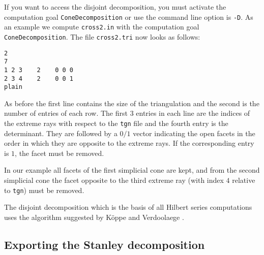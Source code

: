 \documentclass[12pt,a4paper]{scrartcl}
\theoremstyle{definition}
\begin{document}
{\begin{center}
\begin{scriptsize}
	\end{scriptsize}
\end{center}

If you want to access the disjoint decomposition, you must activate the computation goal \verb|ConeDecomposition| or use the command line option is \verb|-D|. As an example we compute \verb|cross2.in| with the computation goal \verb|ConeDecomposition|. The file \verb|cross2.tri| now looks as follows:

\begin{Verbatim}
2
7
1 2 3    2    0 0 0
2 3 4    2    0 0 1
plain
\end{Verbatim}

As before the first line contains the size of the triangulation and the second is the number of entries of each row.
The first $3$ entries in each line are the indices of the extreme rays with respect to the \verb|tgn| file and the fourth entry is the determinant. They are followed by a $0/1$ vector indicating the open facets in the order in which they are opposite to the extreme rays. If the corresponding entry is $1$, the facet must be removed. 

In our example all facets of the first simplicial cone are kept, and from the second simplicial cone the facet opposite to the third extreme ray (with index $4$ relative to \verb|tgn|) must be removed.

The disjoint decomposition which is the basis of all Hilbert series computations uses the algorithm suggested by K\"oppe and Verdoolaege \cite{KV}.


\subsection{Exporting the Stanley decomposition}\label{Stanley}

}
\end{document}
